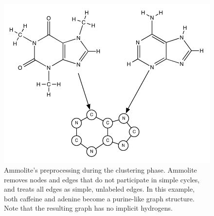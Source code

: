 \documentclass[review,preprint,12pt]{elsarticle}
\theoremstyle{definition}
\theoremstyle{remark}
\begin{document}
\renewcommand\thefigure{S\arabic{figure}}
\setcounter{figure}{0}
\renewcommand\thetable{S\arabic{table}}
\setcounter{table}{0}


\begin{figure}[hbp]
    \centering
    \includegraphics[width=1\textwidth]{assets/ammolite-simplification.pdf}
    \caption{ Ammolite's preprocessing during the clustering phase. Ammolite 
    removes nodes and edges that do not participate in simple cycles, and 
    treats all edges as simple, unlabeled edges. In this example, both caffeine 
    and adenine become a purine-like graph structure. Note that the resulting 
    graph has no implicit hydrogens.
    }
    \label{fig:ammolite}
\end{figure}
\end{document}

